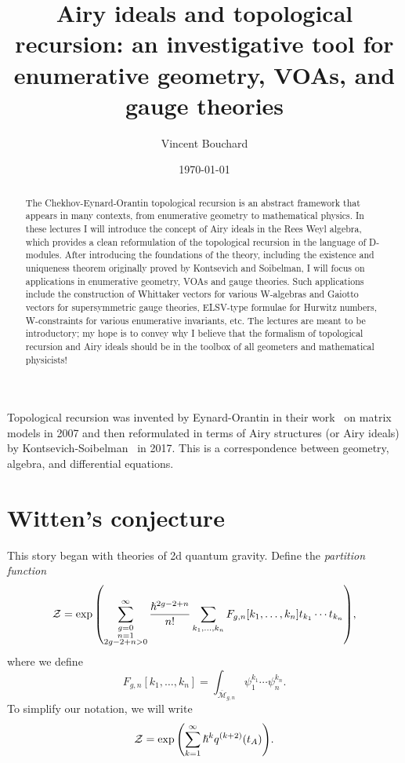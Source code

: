 \documentclass{amsart}
\title[Airy ideals and topological recursion]{Airy ideals and topological recursion: an investigative tool for enumerative geometry, VOAs, and gauge theories}%
\author{Vincent Bouchard}
\date{\today}
\theoremstyle{definition}
\theoremstyle{remark}
\theoremstyle{plain}
\theoremstyle{definition}
\theoremstyle{remark}
\newcommand{\mc}[1]{\mathcal{#1}}
\newcommand{\ol}[1]{\overline{#1}}
\newcommand{\1}{\mathbf{1}}
\newcommand{\2}{\mathbf{2}}
\newcommand{\3}{\mathbf{3}}
\begin{document}
    
\maketitle

\begin{abstract}
    The Chekhov-Eynard-Orantin topological recursion is an abstract framework that appears in many contexts, from enumerative geometry to mathematical physics. In these lectures I will introduce the concept of Airy ideals in the Rees Weyl algebra, which provides a clean reformulation of the topological recursion in the language of D-modules. After introducing the foundations of the theory, including the existence and uniqueness theorem originally proved by Kontsevich and Soibelman, I will focus on applications in enumerative geometry, VOAs and gauge theories. Such applications include the construction of Whittaker vectors for various W-algebras and Gaiotto vectors for supersymmetric gauge theories, ELSV-type formulae for Hurwitz numbers, W-constraints for various enumerative invariants, etc. The lectures are meant to be introductory; my hope is to convey why I believe that the formalism of topological recursion and Airy ideals should be in the toolbox of all geometers and mathematical physicists!
\end{abstract}



Topological recursion was invented by Eynard-Orantin in their work~\cite{toprecursion} on matrix models in 2007 and then reformulated in terms of Airy structures (or Airy ideals) by Kontsevich-Soibelman~\cite{airytoprec} in 2017. This is a correspondence between geometry, algebra, and differential equations.

\section{Witten's conjecture}

This story began with theories of 2d quantum gravity.
Define the \textit{partition function}
\[ \mc{Z} = \exp \qty(\sum_{\substack{g=0 \\ n=1 \\ 2g-2+n>0}}^{\infty} \frac{\hslash^{2g-2+n}}{n!} \sum_{k_1, \ldots, k_n} F_{g,n}[k_1, \ldots, k_n] t_{k_1} \cdots t_{k_n}), \]
where we define
\[ F_{g,n}[k_1, \ldots, k_n] = \int_{\ol{\mc{M}}_{g,n}} \psi_1^{k_1} \cdots \psi_n^{k_n}. \]
To simplify our notation, we will write
\[ \mc{Z} = \exp \qty(\sum_{k=1}^{\infty} \hslash^k q^{(k+2)}(t_A)). \]
\end{document}
